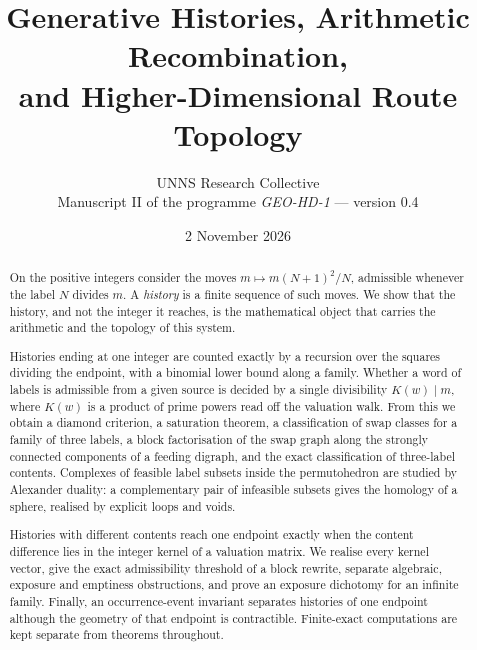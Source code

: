 \documentclass[11pt]{article}
\title{Generative Histories, Arithmetic Recombination,\\ and Higher-Dimensional Route Topology}
\author{UNNS Research Collective\\[2pt]\small Manuscript II of the programme \emph{GEO-HD-1} --- version 0.4}
\date{2 November 2026}
\theoremstyle{plain}
\theoremstyle{definition}
\theoremstyle{remark}
\begin{document}
\maketitle
\begin{abstract}
On the positive integers consider the moves $m\mapsto m(N+1)^2/N$, admissible whenever the label $N$ divides $m$. A \emph{history} is a finite sequence of such moves. We show that the history, and not the integer it reaches, is the mathematical object that carries the arithmetic and the topology of this system.

Histories ending at one integer are counted exactly by a recursion over the squares dividing the endpoint, with a binomial lower bound along a family. Whether a word of labels is admissible from a given source is decided by a single divisibility $K(w)\mid m$, where $K(w)$ is a product of prime powers read off the valuation walk. From this we obtain a diamond criterion, a saturation theorem, a classification of swap classes for a family of three labels, a block factorisation of the swap graph along the strongly connected components of a feeding digraph, and the exact classification of three-label contents. Complexes of feasible label subsets inside the permutohedron are studied by Alexander duality: a complementary pair of infeasible subsets gives the homology of a sphere, realised by explicit loops and voids.

Histories with different contents reach one endpoint exactly when the content difference lies in the integer kernel of a valuation matrix. We realise every kernel vector, give the exact admissibility threshold of a block rewrite, separate algebraic, exposure and emptiness obstructions, and prove an exposure dichotomy for an infinite family. Finally, an occurrence-event invariant separates histories of one endpoint although the geometry of that endpoint is contractible. Finite-exact computations are kept separate from theorems throughout.
\end{abstract}
\tableofcontents














\appendix





\end{document}
